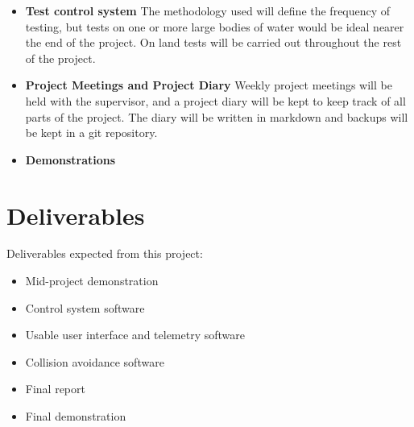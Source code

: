 \documentclass[titlepage 12pt]{article}
\begin{document}
{\begin{itemize}
\item \textbf{Test control system} The methodology used will define the frequency of testing, but tests on one or more large bodies of water would be ideal nearer the end of the project. On land tests will be carried out throughout the rest of the project.
\item \textbf{Project Meetings and Project Diary} Weekly project meetings will be held with the supervisor, and a project diary will be kept to keep track of all parts of the project. The diary will be written in markdown and backups will be kept in a git repository.
\item \textbf{Demonstrations}
\end{itemize}




\section{Deliverables}  
Deliverables expected from this project: 
\begin{itemize}
	\item Mid-project demonstration
	\item Control system software
	\item Usable user interface and telemetry software
	\item Collision avoidance software
	\item Final report
	\item Final demonstration
\end{itemize}


    
\newpage
\raggedright
{}
\printbibliography[title={Annotated Bibliography}]
%


}
\end{document}
